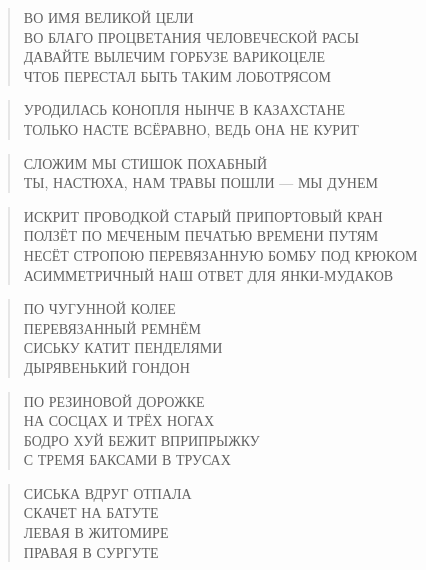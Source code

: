 \poemtitle{***}
\begin{verse}
ВО ИМЯ ВЕЛИКОЙ ЦЕЛИ\\
ВО БЛАГО ПРОЦВЕТАНИЯ ЧЕЛОВЕЧЕСКОЙ РАСЫ\\
ДАВАЙТЕ ВЫЛЕЧИМ ГОРБУЗЕ ВАРИКОЦЕЛЕ\\
ЧТОБ ПЕРЕСТАЛ БЫТЬ ТАКИМ ЛОБОТРЯСОМ
\end{verse}

\poemtitle{***}
\begin{verse}
УРОДИЛАСЬ КОНОПЛЯ НЫНЧЕ В КАЗАХСТАНЕ\\
ТОЛЬКО НАСТЕ ВСЁРАВНО, ВЕДЬ ОНА НЕ КУРИТ
\end{verse}

\poemtitle{***}
\begin{verse}
СЛОЖИМ МЫ СТИШОК ПОХАБНЫЙ\\
ТЫ, НАСТЮХА, НАМ ТРАВЫ ПОШЛИ — МЫ ДУНЕМ
\end{verse}

\poemtitle{***}
\begin{verse}
ИСКРИТ ПРОВОДКОЙ СТАРЫЙ ПРИПОРТОВЫЙ КРАН\\
ПОЛЗЁТ ПО МЕЧЕНЫМ ПЕЧАТЬЮ ВРЕМЕНИ ПУТЯМ\\
НЕСЁТ СТРОПОЮ ПЕРЕВЯЗАННУЮ БОМБУ ПОД КРЮКОМ\\
АСИММЕТРИЧНЫЙ НАШ ОТВЕТ ДЛЯ ЯНКИ-МУДАКОВ
\end{verse}

\poemtitle{***}
\begin{verse}
ПО ЧУГУННОЙ КОЛЕЕ\\
ПЕРЕВЯЗАННЫЙ РЕМНЁМ\\
СИСЬКУ КАТИТ ПЕНДЕЛЯМИ\\
ДЫРЯВЕНЬКИЙ ГОНДОН
\end{verse}

\poemtitle{***}
\begin{verse}
ПО РЕЗИНОВОЙ ДОРОЖКЕ\\
НА СОСЦАХ И ТРЁХ НОГАХ\\
БОДРО ХУЙ БЕЖИТ ВПРИПРЫЖКУ\\
С ТРЕМЯ БАКСАМИ В ТРУСАХ
\end{verse}

\poemtitle{***}
\begin{verse}
СИСЬКА ВДРУГ ОТПАЛА\\
СКАЧЕТ НА БАТУТЕ\\
ЛЕВАЯ В ЖИТОМИРЕ\\
ПРАВАЯ В СУРГУТЕ
\end{verse}

